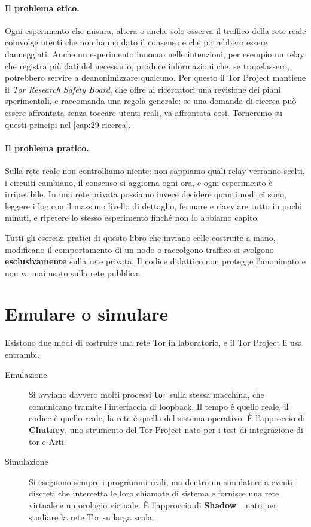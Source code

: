 \paragraph{Il problema etico.} Ogni esperimento che misura, altera o anche solo osserva il traffico della rete reale coinvolge utenti che non hanno dato il consenso e che potrebbero essere danneggiati. Anche un esperimento innocuo nelle intenzioni, per esempio un relay che registra più dati del necessario, produce informazioni che, se trapelassero, potrebbero servire a deanonimizzare qualcuno. Per questo il Tor Project mantiene il \emph{Tor Research Safety Board}, che offre ai ricercatori una revisione dei piani sperimentali, e raccomanda una regola generale: se una domanda di ricerca può essere affrontata senza toccare utenti reali, va affrontata così. Torneremo su questi principi nel \cref{cap:29-ricerca}.

\paragraph{Il problema pratico.} Sulla rete reale non controlliamo niente: non sappiamo quali relay verranno scelti, i circuiti cambiano, il consenso si aggiorna ogni ora, e ogni esperimento è irripetibile. In una rete privata possiamo invece decidere quanti nodi ci sono, leggere i log con il massimo livello di dettaglio, fermare e riavviare tutto in pochi minuti, e ripetere lo stesso esperimento finché non lo abbiamo capito.

\begin{attenzione}
Tutti gli esercizi pratici di questo libro che inviano celle costruite a mano, modificano il comportamento di un nodo o raccolgono traffico si svolgono \textbf{esclusivamente} sulla rete privata. Il codice didattico  non protegge l'anonimato e non va mai usato sulla rete pubblica.
\end{attenzione}

\section{Emulare o simulare}\label{sec:rp-strumenti}

Esistono due modi di costruire una rete Tor in laboratorio, e il Tor Project li usa entrambi.

\begin{description}
  \item[Emulazione] Si avviano davvero molti processi \texttt{tor} sulla stessa macchina, che comunicano tramite l'interfaccia di loopback. Il tempo è quello reale, il codice è quello reale, la rete è quella del sistema operativo. È l'approccio di \textbf{Chutney}, uno strumento del Tor Project nato per i test di integrazione di tor e Arti.
  \item[Simulazione] Si eseguono sempre i programmi reali, ma dentro un simulatore a eventi discreti che intercetta le loro chiamate di sistema e fornisce una rete virtuale e un orologio virtuale. È l'approccio di \textbf{Shadow}~\cite{jansen2012shadow}, nato per studiare la rete Tor su larga scala.
\end{description}

